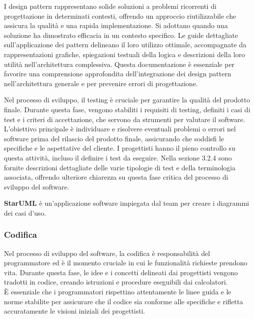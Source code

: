 I design pattern rappresentano solide soluzioni a problemi ricorrenti di progettazione in determinati contesti, offrendo un approccio riutilizzabile che assicura la qualità e una rapida implementazione. Si adottano quando una soluzione ha dimostrato efficacia in un contesto specifico. Le guide dettagliate sull'applicazione dei pattern delineano il loro utilizzo ottimale, accompagnate da rappresentazioni grafiche, spiegazioni testuali della logica e descrizioni della loro utilità nell'architettura complessiva. Questa documentazione è essenziale per favorire una comprensione approfondita dell'integrazione dei design pattern nell'architettura generale e per prevenire errori di progettazione.

Nel processo di sviluppo, il testing è cruciale per garantire la qualità del prodotto finale. Durante questa fase, vengono stabiliti i requisiti di testing, definiti i casi di test e i criteri di accettazione, che servono da strumenti per valutare il software.\\ L'obiettivo principale è individuare e risolvere eventuali problemi o errori nel software prima del rilascio del prodotto finale, assicurando che soddisfi le specifiche e le aspettative del cliente. I progettisti hanno il pieno controllo su questa attività, incluso il definire i test da eseguire. Nella sezione 3.2.4 sono fornite descrizioni dettagliate delle varie tipologie di test e della terminologia associata, offrendo ulteriore chiarezza su questa fase critica del processo di sviluppo del software.

\textbf{StarUML} è un'applicazione software impiegata dal team per creare i diagrammi dei casi d'uso.

\subsubsection{Codifica}
Nel processo di sviluppo del software, la codifica è responsabilità del programmatore ed è il momento cruciale in cui le funzionalità richieste prendono vita. Durante questa fase, le idee e i concetti delineati dai progettisti vengono tradotti in codice, creando istruzioni e procedure eseguibili dai calcolatori.\\ È essenziale che i programmatori rispettino attentamente le linee guida e le norme stabilite per assicurare che il codice sia conforme alle specifiche e rifletta accuratamente le visioni iniziali dei progettisti.

